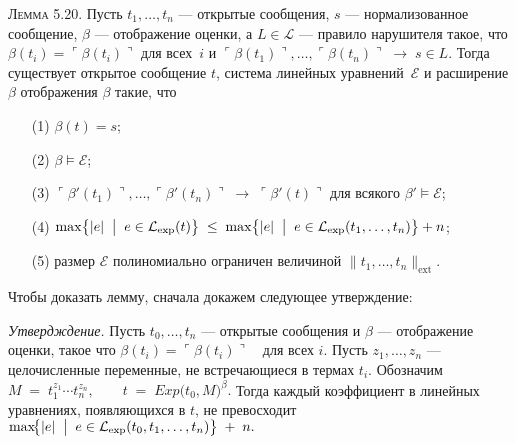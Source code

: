 \textsc{Лемма 5.20.}
Пусть $t_{1},\dots,t_{n}$ — открытые сообщения,
$s$ — нормализованное сообщение,
$\beta$ — отображение оценки,
а $L\in\mathcal L$ — правило нарушителя такое, что
$\beta(t_{i})=\ulcorner\beta(t_{i})\urcorner$ для всех~$i$
и
$\ulcorner\beta(t_{1})\urcorner,\dots,
 \ulcorner\beta(t_{n})\urcorner \;\rightarrow\; s\in L$.
Тогда существует открытое сообщение $t$,
система линейных уравнений~$\mathcal E$
и расширение $\beta$ отображения $\beta$ такие, что
\begin{enumerate}\itemsep0pt
  \item[\textup{(1)}] $\beta(t)=s$;
  \item[\textup{(2)}] $\beta \models \mathcal E$;
  \item[\textup{(3)}] $\ulcorner\beta'(t_{1})\urcorner,\dots,
        \ulcorner\beta'(t_{n})\urcorner
        \;\rightarrow\;
        \ulcorner\beta'(t)\urcorner$
        для всякого $\beta'\models\mathcal E$;
  \item[\textup{(4)}] $\displaystyle
        \max\bigl\{|e|\;\bigm|\;e\in \mathcal L_{\text{exp}}(t)\bigr\}
        \;\le\;
        \max\bigl\{|e|\;\bigm|\;e\in \mathcal L_{\text{exp}}(t_{1},\dots,t_{n})\bigr\}
        + n$;
  \item[\textup{(5)}] размер $\mathcal E$ полиномиально ограничен
        величиной $\lVert t_{1},\dots,t_{n}\rVert_{\text{ext}}$.
\end{enumerate}
Чтобы доказать лемму, сначала докажем следующее утверждение:

\textit{Утвердждение.} Пусть $t_{0},\dots,t_{n}$ — открытые сообщения и $\beta$ — отображение оценки, такое что 
\(
  \beta(t_{i})=\ulcorner\beta(t_{i})\urcorner
  \quad\text{для всех }i.
\)
Пусть $z_{1},\dots,z_{n}$ — целочисленные переменные, не встречающиеся в термах $t_{i}$.  
Обозначим 
\(
  M \;=\; t_{1}^{z_{1}}\cdots t_{n}^{z_{n}},
  \qquad
  t \;=\; Exp\bigl(t_{0},M\bigr)^{\beta}.
\)
Тогда каждый коэффициент в линейных уравнениях, появляющихся в $t$, не превосходит
\(
  \max\!\bigl\{|e|\;\bigm|\;e\in \mathcal L_{\exp}(t_{0},t_{1},\dots,t_{n})\bigr\}\;+\;n.
\)

